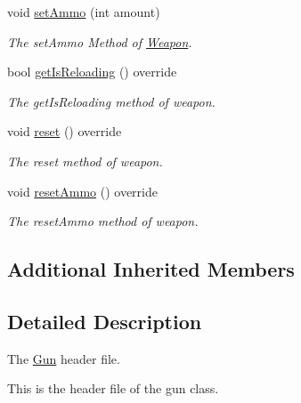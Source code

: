 \begin{DoxyCompactItemize}
\item 
void \hyperlink{class_gun_a32ff9325061ddab247a5d726d8f98207}{set\+Ammo} (int amount)
\begin{DoxyCompactList}\small\item\em The set\+Ammo Method of \hyperlink{class_weapon}{Weapon}. \end{DoxyCompactList}\item 
bool \hyperlink{class_gun_af74d11f4e7f839f4a5842557caeecd64}{get\+Is\+Reloading} () override
\begin{DoxyCompactList}\small\item\em The get\+Is\+Reloading method of weapon. \end{DoxyCompactList}\item 
void \hyperlink{class_gun_adda4a40faac31a145d132ff88002ea20}{reset} () override
\begin{DoxyCompactList}\small\item\em The reset method of weapon. \end{DoxyCompactList}\item 
void \hyperlink{class_gun_aa9b43a5d5d47f8d4c09689fbf4ae84c3}{reset\+Ammo} () override
\begin{DoxyCompactList}\small\item\em The reset\+Ammo method of weapon. \end{DoxyCompactList}\end{DoxyCompactItemize}
\subsection*{Additional Inherited Members}


\subsection{Detailed Description}
The \hyperlink{class_gun}{Gun} header file. 

This is the header file of the gun class. 

